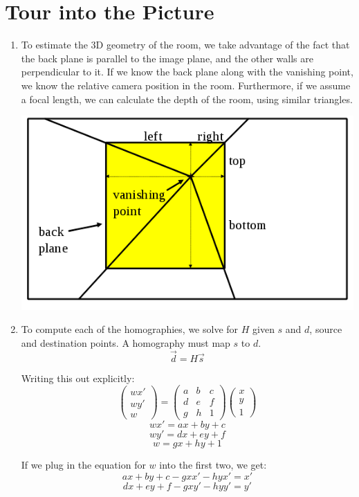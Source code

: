 \documentclass[11pt]{article}
\begin{document}
\section{Tour into the Picture}
\begin{enumerate}
\item To estimate the 3D geometry of the room, we take advantage of the fact
    that the back plane is parallel to the image plane, and the other walls
    are perpendicular to it.  If we know the back plane along with the
    vanishing point, we know the relative camera position in the room.
    Furthermore, if we assume a focal length, we can calculate the depth of
    the room, using similar triangles.

    \includegraphics[width=0.5\linewidth]{./../img/3d_geometry.png}

\item To compute each of the homographies, we solve for $H$ given $s$ and $d$,
    source and destination points. A homography must map $s$ to $d$.
    $$\vec{d} = H\vec{s}$$
    
    Writing this out explicitly:
    $$\begin{pmatrix}wx'\\wy'\\w\end{pmatrix} = 
    \begin{pmatrix}a&b&c\\d&e&f\\g&h&1\end{pmatrix}
    \begin{pmatrix}x\\y\\1\end{pmatrix}$$
    $$wx'=ax + by + c$$
    $$wy'=dx + ey + f$$
    $$w=gx + hy + 1$$

    If we plug in the equation for $w$ into the first two, we get:
    $$ax + by + c - gxx' - hyx' = x'$$
    $$dx + ey + f - gxy' - hyy' = y'$$


\end{enumerate}
\end{document}
